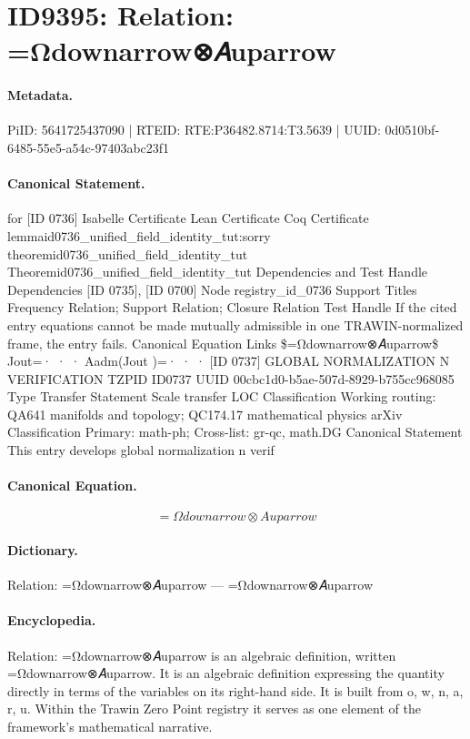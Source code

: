 \section*{ID9395: Relation: =Ωdownarrow⊗𝐴uparrow}
\paragraph{Metadata.}
PiID: 5641725437090 | RTEID: RTE:P36482.8714:T3.5639 | UUID: 0d0510bf-6485-55e5-a54c-97403abc23f1

\paragraph{Canonical Statement.}
for [ID 0736] Isabelle Certificate Lean Certificate Coq Certificate lemmaid0736\_unified\_field\_identity\_tut:sorry theoremid0736\_unified\_field\_identity\_tut Theoremid0736\_unified\_field\_identity\_tut Dependencies and Test Handle Dependencies [ID 0735], [ID 0700] Node registry\_id\_0736 Support Titles Frequency Relation; Support Relation; Closure Relation Test Handle If the cited entry equations cannot be made mutually admissible in one TRAWIN-normalized frame, the entry fails. Canonical Equation Links \$=Ωdownarrow⊗𝐴uparrow\$ Jout=· · · Aadm(Jout )=· · · [ID 0737] GLOBAL NORMALIZATION N VERIFICATION TZPID ID0737 UUID 00cbc1d0-b5ae-507d-8929-b755cc968085 Type Transfer Statement Scale transfer LOC Classification Working routing: QA641 manifolds and topology; QC174.17 mathematical physics arXiv Classification Primary: math-ph; Cross-list: gr-qc, math.DG Canonical Statement This entry develops global normalization n verif

\paragraph{Canonical Equation.}
\[
=Ωdownarrow⊗𝐴uparrow
\]

\paragraph{Dictionary.}
Relation: =Ωdownarrow⊗𝐴uparrow — =Ωdownarrow⊗𝐴uparrow

\paragraph{Encyclopedia.}
Relation: =Ωdownarrow⊗𝐴uparrow is an algebraic definition, written =Ωdownarrow⊗𝐴uparrow. It is an algebraic definition expressing the quantity directly in terms of the variables on its right-hand side. It is built from o, w, n, a, r, u. Within the Trawin Zero Point registry it serves as one element of the framework's mathematical narrative.
